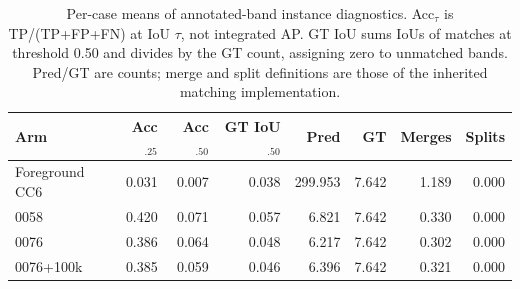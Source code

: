 \begin{table}[t]
\centering
\small
\setlength{\tabcolsep}{4pt}
\begin{tabular}{lrrrrrrr}
\toprule
Arm & Acc$_{.25}$ & Acc$_{.50}$ & GT IoU$_{.50}$ & Pred & GT & Merges & Splits \\
\midrule
Foreground CC6 & 0.031 & 0.007 & 0.038 & 299.953 & 7.642 & 1.189 & 0.000 \\
0058 & 0.420 & 0.071 & 0.057 & 6.821 & 7.642 & 0.330 & 0.000 \\
0076 & 0.386 & 0.064 & 0.048 & 6.217 & 7.642 & 0.302 & 0.000 \\
0076+100k & 0.385 & 0.059 & 0.046 & 6.396 & 7.642 & 0.321 & 0.000 \\
\bottomrule
\end{tabular}
\caption{Per-case means of annotated-band instance diagnostics. Acc$_\tau$ is TP/(TP+FP+FN) at IoU $\tau$, not integrated AP. GT IoU sums IoUs of matches at threshold 0.50 and divides by the GT count, assigning zero to unmatched bands. Pred/GT are counts; merge and split definitions are those of the inherited matching implementation.}
\label{tab:autoinst}
\end{table}
